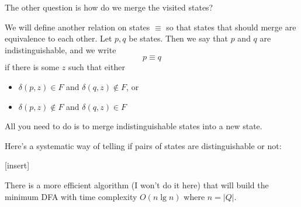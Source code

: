 The other question is how do we merge the visited states?

We will define another relation on states $\equiv$ so that states
that should merge are equivalence to each other. Let $p,q$ be
states. Then we say that $p$ and $q$ are indistinguishable, and we
write
\[
 p \equiv q
\]
if there is some $z$ such that either
\begin{itemize}
 \item $\delta(p,z) \in F$ and $\delta(q,z) \notin F$, or
 \item $\delta(p,z) \notin F$ and $\delta(q,z) \in F$
 \end{itemize}
All you need to do is to merge indistinguishable states into a new
state.

Here's a systematic way of telling if pairs of states are
distinguishable or not:

[insert]

There is a more efficient algorithm (I won't do it here) that will
build the minimum DFA with time complexity $O(n \lg n)$ where $n =
|Q|$.
